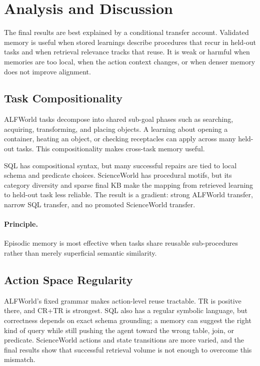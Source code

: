 \section{Analysis and Discussion}
\label{sec:analysis}

The final results are best explained by a conditional transfer account.
Validated memory is useful when stored learnings describe procedures that recur in held-out tasks and when retrieval relevance tracks that reuse.
It is weak or harmful when memories are too local, when the action context changes, or when denser memory does not improve alignment.

\subsection{Task Compositionality}
\label{sec:compositionality}

ALFWorld tasks decompose into shared sub-goal phases such as searching, acquiring, transforming, and placing objects.
A learning about opening a container, heating an object, or checking receptacles can apply across many held-out tasks.
This compositionality makes cross-task memory useful.

SQL has compositional syntax, but many successful repairs are tied to local schema and predicate choices.
ScienceWorld has procedural motifs, but its category diversity and sparse final KB make the mapping from retrieved learning to held-out task less reliable.
The result is a gradient: strong ALFWorld transfer, narrow SQL transfer, and no promoted ScienceWorld transfer.

\paragraph{Principle.}
Episodic memory is most effective when tasks share reusable sub-procedures rather than merely superficial semantic similarity.

\subsection{Action Space Regularity}
\label{sec:action-space}

ALFWorld's fixed grammar makes action-level reuse tractable.
TR is positive there, and CR+TR is strongest.
SQL also has a regular symbolic language, but correctness depends on exact schema grounding; a memory can suggest the right kind of query while still pushing the agent toward the wrong table, join, or predicate.
ScienceWorld actions and state transitions are more varied, and the final results show that successful retrieval volume is not enough to overcome this mismatch.

